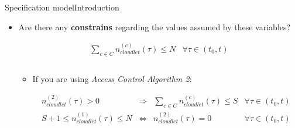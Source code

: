 \documentclass[10pt]{beamer}
\begin{document}
\begin{frame}{Specification model}{Introduction}

\begin{itemize}
\item Are there any \textbf{constrains} regarding the values assumed by these variables?

\begin{equation}
\begin{array} {lr} 
\displaystyle \sum_{c \in C} n_{cloudlet}^{(c)}(\tau) \leq N & \forall \tau \in (t_0, t) \\\\
\end{array}
\end{equation}

\begin{itemize}
\item If you are using \textit{Access Control Algorithm 2}:

\begin{equation}
\begin{array} {rccr} 
n_{cloudlet}^{(2)}(\tau) > 0 & \Rightarrow & \displaystyle \sum_{c \in C} n_{cloudlet}^{(c)}(\tau) \leq S & \forall \tau \in (t_0, t) \\
S + 1 \leq n_{cloudlet}^{(1)}(\tau) \leq N & \Leftrightarrow & n_{cloudlet}^{(2)}(\tau) = 0 & \forall \tau \in (t_0, t)
\end{array}
\end{equation}
\end{itemize}

\end{itemize}

\end{frame}

\end{document}
